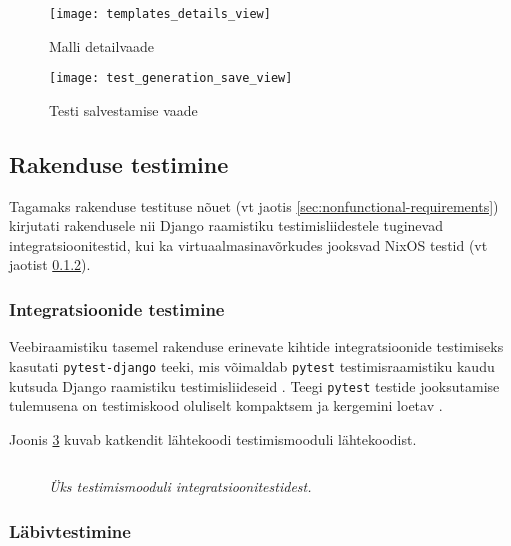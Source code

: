 \begin{figure}[H]
    \centering
    \texttt{[image: templates\_details\_view]}
    \caption{Malli detailvaade}
    \label{fig:template_details_view}
\end{figure}

\begin{figure}[H]
    \centering
    \texttt{[image: test\_generation\_save\_view]}
    \caption{Testi salvestamise vaade}
    \label{fig:test_generation_save_view}
\end{figure}

\subsection{Rakenduse testimine}

Tagamaks rakenduse testituse nõuet (vt jaotis \ref{sec:nonfunctional-requirements}) kirjutati rakendusele nii Django raamistiku testimisliidestele \cite{django-testing-api} tuginevad integratsioonitestid, kui ka virtuaalmasinavõrkudes jooksvad NixOS testid \cite{nixos-tests} (vt jaotist \ref{subsubsec:e2etests}).

\subsubsection{Integratsioonide testimine}

Veebiraamistiku tasemel rakenduse erinevate kihtide integratsioonide testimiseks kasutati \texttt{pytest-django} teeki, mis võimaldab
\texttt{pytest} testimisraamistiku kaudu kutsuda Django raamistiku testimisliideseid \cite{pytest-django-usage}. Teegi \texttt{pytest} testide jooksutamise tulemusena on testimiskood oluliselt kompaktsem ja kergemini loetav \cite{pytest-django-why}.

Joonis \ref{fig:pytest} kuvab katkendit lähtekoodi testimismooduli lähtekoodist.

\begin{figure}
\inputminted[breaklines]{py}{chapters/data/test.py}
\caption{\emph{Üks testimismooduli integratsioonitestidest.}}\label{fig:pytest}
\end{figure}

\subsubsection{Läbivtestimine}\label{subsubsec:e2etests}

\newcommand{\stateActually}{Tegelikkuses kirjeldavad NixOS konfiguratsioonid paketi tootestamisel toodetuid skripte ja muid ressursse, mis hostile NixOS konfiguratsiooni paigaldavad. Praktikas on tööriistakomplekti korratavusgarantiid nii tugevad, et sellest võib mõelda kui konfiguratsiooni olekust hostil.}

